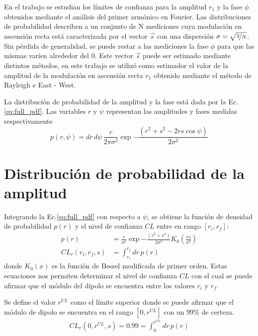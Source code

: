 
En el trabajo \cite{linsley1975fluctuation} se estudian los límites de confianza para la amplitud $r_1$ y la fase $\phi$ obtenidos mediante el análisis del primer armónico en Fourier. Las distribuciones de probabilidad describen a un conjunto de N mediciones cuya modulación en ascensión recta está caracterizada por el vector $\vec{s}$ con una dispersión $\sigma = \sqrt{\nicefrac{2}{N}}$.  Sin pérdida de generalidad, se puede restar a las mediciones la fase $\phi$ para que las mismas varíen alrededor del 0. Este vector $\vec{s}$ puede ser estimado mediante distintos métodos, en este trabajo se  utilizó como estimador el valor de la amplitud de la modulación en ascensión recta $r_1$ obtenido mediante el método de Rayleigh e East - West.

La distribución de probabilidad de la amplitud y la fase está dada por la Ec.\ref{eq:full_pdf}. Las variables $r$ y $\psi$ representan las amplitudes y fases medidas respectivamente
\begin{equation}
    p(r,\psi) =dr\,d\psi\,\frac{r}{2\pi\sigma^2}\exp{ -\frac{(r^2+s^2 - 2rs\cos\psi)}{2\sigma^2} } \label{eq:full_pdf}
\end{equation}  

\section{Distribución de probabilidad de la amplitud}

Integrando la Ec.\ref{eq:full_pdf} con respecto a $\psi$, se obtiene la función de densidad de probabilidad $p(r)$ y el nivel de confianza $CL$ entre en rango $[r_i,r_f]$:
\begin{align}
    p(r) &=\frac{r}{\sigma^2}\exp{ -\frac{(r^2+s^2)}{2\sigma^2} }K_0(\frac{rs}{\sigma^2})    \label{ec:pdf}\\
    CL_r(r_i,r_f,s) &= \int_{r_i}^{r_f} dr \, p(r)
    \label{ec:integral}
\end{align}
donde $K_0(x)$ es la función de Bessel modificada de primer orden.
Estas ecuaciones nos permiten determinar el nivel de confianza $CL$ con el cual se puede afirmar que el módulo del dipolo se encuentra entre los valores $r_i$ y $r_f$.

Se define el valor $r^{UL}$ como el límite superior donde se puede afirmar que el módulo de dipolo se encuentra en el rango $[0, r^{UL}]$ con un $99\%$ de certeza.
\begin{align}
    CL_r(0,r^{UL},s) = 0.99 = \int_{0}^{r^{UL}} dr \, p(r)
    \label{ec:r_upper_limit}
\end{align} 

